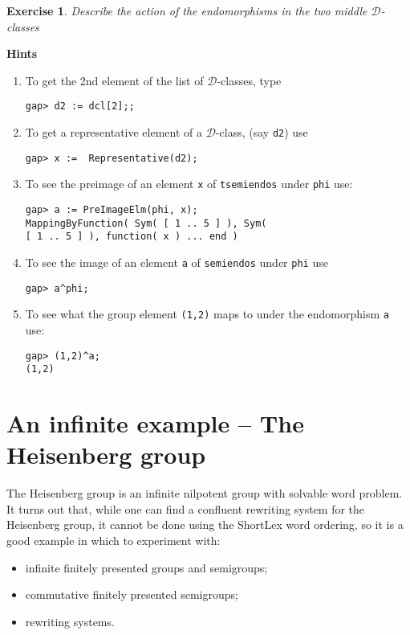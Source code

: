 \documentclass[12pt]{article}
\theoremstyle{plain} \newtheorem{Thm}{Theorem}
\theoremstyle{plain} \newtheorem{Cor}{Corollary}
\theoremstyle{plain} \newtheorem{Lemma}{Lemma}
\theoremstyle{plain} \newtheorem{Prop}{Proposition}
\theoremstyle{plain} \newtheorem{Ex}{Exercise}
\def\d{${\mathcal{D}}$}
\begin{document}
\begin{Ex}
Describe the action of the endomorphisms in the two middle  
$\mathcal{D}$-classes
\end{Ex}
{\bf Hints}
\begin{enumerate}
\item  To get the 2nd element of the list of \d-classes, type
\begin{verbatim}
gap> d2 := dcl[2];;
\end{verbatim}
\item To get a representative element of a \d-class, (say {\tt d2})
use 
\begin{verbatim}
gap> x :=  Representative(d2);
\end{verbatim}
\item To see the preimage of an element {\tt x} of {\tt tsemiendos} under
{\tt phi} use:
\begin{verbatim}
gap> a := PreImageElm(phi, x);     
MappingByFunction( Sym( [ 1 .. 5 ] ), Sym( 
[ 1 .. 5 ] ), function( x ) ... end )
\end{verbatim}
\item To see the image of an element {\tt a} of {\tt semiendos} under
{\tt phi} use 
\begin{verbatim}
gap> a^phi;
\end{verbatim}
\item To see what the group element {\tt (1,2)} 
maps to under the endomorphism {\tt a} use:
\begin{verbatim}
gap> (1,2)^a;
(1,2)
\end{verbatim}
\end{enumerate}


\section{An infinite example -- The Heisenberg group}
The Heisenberg group is an infinite nilpotent group with
solvable word problem. It turns out that, while one can
find a confluent rewriting system for the Heisenberg group,
it cannot be done using the ShortLex word ordering, so
it is a good example in which to experiment with:
\begin{itemize}
\item infinite finitely presented groups and semigroups;
\item commutative finitely presented semigroups;
\item rewriting systems.
\end{itemize}
\end{document}
